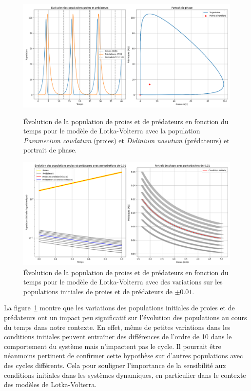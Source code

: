 \documentclass{article}
\begin{document}
\begin{figure}[H]
  \centering
  \begin{minipage}{0.48\textwidth}
    \centering
    \includegraphics[width=\textwidth]{img/population_dynamics.png}
    \caption{Évolution de la population de proies et de prédateurs en fonction du temps pour le modèle de Lotka-Volterra avec la population \textit{Paramecium caudatum} (proies) et \textit{Didinium nasutum} (prédateurs) et portrait de phase.}
    \label{fig:lotka_volterra}
  \end{minipage}
  \hfill
  \begin{minipage}{0.48\textwidth}
    \centering
    \includegraphics[width=\textwidth]{img/solutions_around_initial_zoom.png} %
    \caption{Évolution de la population de proies et de prédateurs en fonction du temps pour le modèle de Lotka-Volterra avec des variations sur les populations initiales de proies et de prédateurs de $\pm 0.01$.}
    \label{fig:lotka_volterra_variations}
  \end{minipage}
\end{figure}
La figure~\ref{fig:lotka_volterra_variations} montre que les variations des populations initiales de proies et de prédateurs ont un impact peu significatif sur l'évolution des populations au cours du temps dans notre contexte. En effet, même de petites variations dans les conditions initiales peuvent entraîner des différences de l'ordre de 10 dans le comportement du système mais n'impactent pas le cycle. Il pourrait être néanmoins pertinent de confirmer cette hypothèse sur d'autres populations avec des cycles différents. Cela pour souligner l'importance de la sensibilité aux conditions initiales dans les systèmes dynamiques, en particulier dans le contexte des modèles de Lotka-Volterra.\\ \\
\end{document}
